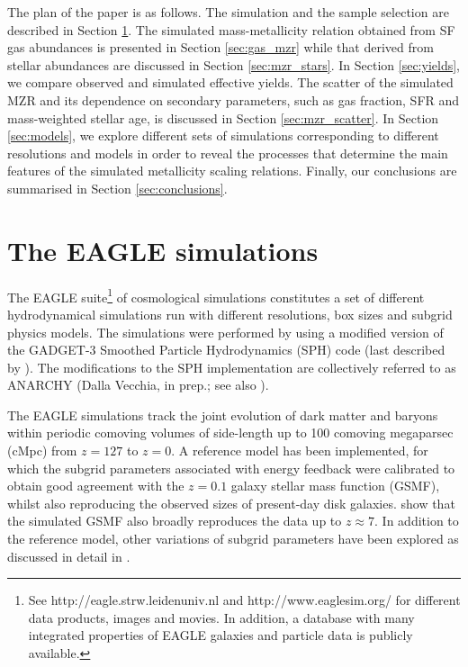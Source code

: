\documentclass[useAMS,usenatbib]{mn2e}
\begin{document}
The plan of the paper is as follows. The simulation and the sample selection
are described in Section \ref{sec:simulation}.
The simulated mass-metallicity relation obtained from SF gas abundances is presented in 
Section \ref{sec:gas_mzr} while that derived from stellar abundances are discussed in 
Section \ref{sec:mzr_stars}.  In Section \ref{sec:yields}, we compare observed and simulated
effective yields.  The scatter of the simulated MZR and 
its dependence on secondary parameters, such as gas fraction,
SFR and mass-weighted stellar age, is discussed in Section \ref{sec:mzr_scatter}.
In Section \ref{sec:models}, we explore different sets of simulations corresponding to different resolutions
and models in order to reveal the processes that
determine the main features of the simulated metallicity scaling relations.
Finally, our conclusions are summarised in Section \ref{sec:conclusions}.


\section{The {\sc EAGLE} simulations}
\label{sec:simulation}

The {\sc EAGLE} suite\footnote{See 
http://eagle.strw.leidenuniv.nl and http://www.eaglesim.org/ for different data
products, images and movies.  In addition, {
a database with many integrated properties of {\sc EAGLE} galaxies  \citep{mcalpine2015}
and particle data \citep{eagle2017} is publicly available.}}
of cosmological simulations \citep{schaye2015, crain2015} constitutes
a set of different hydrodynamical simulations run with different 
resolutions, box sizes and subgrid physics models.  
The simulations were performed by using a modified 
version of the {\sc GADGET-3} Smoothed Particle Hydrodynamics (SPH) code 
(last described by \citealt{springel2005a}). The modifications to the SPH implementation
are collectively referred to as ANARCHY (Dalla Vecchia, in prep.; see also \citealt{schaller2015a}). 

The {\sc EAGLE} simulations track the joint evolution of dark matter and baryons  
within periodic comoving volumes of side-length up to 100 comoving megaparsec (cMpc) from $z=127$ to $z=0$.  
A reference model has been implemented, for which the subgrid parameters associated
with energy feedback were calibrated to obtain good agreement with the $z=0.1$ galaxy
stellar mass function (GSMF), whilst also reproducing the observed sizes of present-day disk galaxies.
\citet{furlong2014} show that the simulated GSMF 
also broadly reproduces the data up to $z \approx 7$. In addition to the reference model,
other variations of subgrid parameters have been explored as discussed in detail
in \citet{crain2015}.
\end{document}
